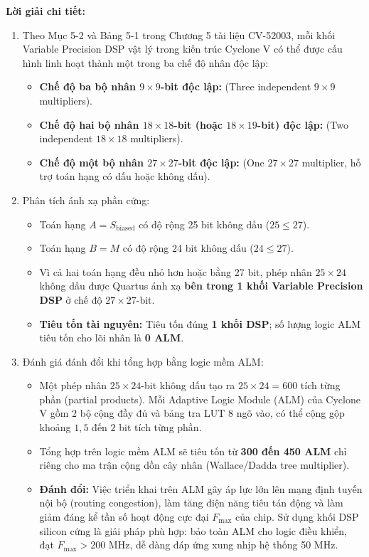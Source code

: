 \textbf{Lời giải chi tiết:}
\begin{enumerate}[label=(\alph*)]
    \item Theo Mục 5-2 và Bảng 5-1 trong Chương 5 tài liệu CV-52003, mỗi khối Variable Precision DSP vật lý trong kiến trúc Cyclone V có thể được cấu hình linh hoạt thành một trong ba chế độ nhân độc lập:
    \begin{itemize}[leftmargin=1.5em, itemsep=1pt]
        \item \textbf{Chế độ ba bộ nhân $9 \times 9$-bit độc lập:} (Three independent $9 \times 9$ multipliers).
        \item \textbf{Chế độ hai bộ nhân $18 \times 18$-bit (hoặc $18 \times 19$-bit) độc lập:} (Two independent $18 \times 18$ multipliers).
        \item \textbf{Chế độ một bộ nhân $27 \times 27$-bit độc lập:} (One $27 \times 27$ multiplier, hỗ trợ toán hạng có dấu hoặc không dấu).
    \end{itemize}

    \item Phân tích ánh xạ phần cứng:
    \begin{itemize}[leftmargin=1.5em, itemsep=1pt]
        \item Toán hạng $A = S_{\text{biased}}$ có độ rộng 25 bit không dấu ($25 \le 27$).
        \item Toán hạng $B = M$ có độ rộng 24 bit không dấu ($24 \le 27$).
        \item Vì cả hai toán hạng đều nhỏ hơn hoặc bằng 27 bit, phép nhân $25 \times 24$ không dấu được Quartus ánh xạ \textbf{bên trong 1 khối Variable Precision DSP} ở chế độ $27 \times 27$-bit.
        \item \textbf{Tiêu tốn tài nguyên:} Tiêu tốn đúng \textbf{1 khối DSP}; số lượng logic ALM tiêu tốn cho lõi nhân là \textbf{0 ALM}.
    \end{itemize}

    \item Đánh giá đánh đổi khi tổng hợp bằng logic mềm ALM:
    \begin{itemize}[leftmargin=1.5em, itemsep=1pt]
        \item Một phép nhân $25 \times 24$-bit không dấu tạo ra $25 \times 24 = 600$ tích từng phần (partial products). Mỗi Adaptive Logic Module (ALM) của Cyclone V gồm 2 bộ cộng đầy đủ và bảng tra LUT 8 ngõ vào, có thể cộng gộp khoảng $1{,}5$ đến $2$ bit tích từng phần.
        \item Tổng hợp trên logic mềm ALM sẽ tiêu tốn từ \textbf{300 đến 450 ALM} chỉ riêng cho ma trận cộng dồn cây nhân (Wallace/Dadda tree multiplier).
        \item \textbf{Đánh đổi:} Việc triển khai trên ALM gây áp lực lớn lên mạng định tuyến nội bộ (routing congestion), làm tăng điện năng tiêu tán động và làm giảm đáng kể tần số hoạt động cực đại $F_{\max}$ của chip. Sử dụng khối DSP silicon cứng là giải pháp phù hợp: bảo toàn ALM cho logic điều khiển, đạt $F_{\max} > 200\text{ MHz}$, dễ dàng đáp ứng xung nhịp hệ thống 50 MHz.
    \end{itemize}
\end{enumerate}

